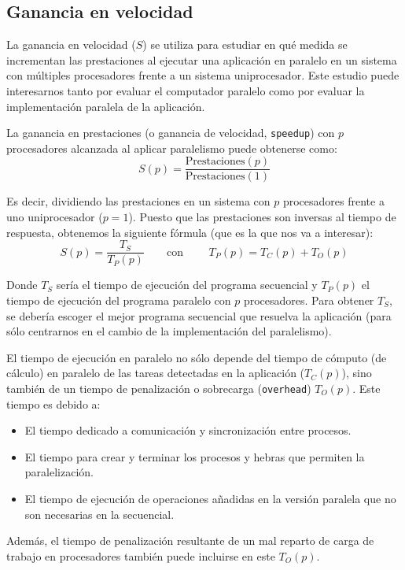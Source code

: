 
\subsection{Ganancia en velocidad}
La ganancia en velocidad ($S$) se utiliza para estudiar en qué medida se incrementan las prestaciones al ejecutar una aplicación en paralelo en un sistema con múltiples procesadores frente a un sistema uniprocesador. Este estudio puede interesarnos tanto por evaluar el computador paralelo como por evaluar la implementación paralela de la aplicación.

La ganancia en prestaciones (o ganancia de velocidad, \verb|speedup|) con $p$ procesadores alcanzada al aplicar paralelismo puede obtenerse como:
\begin{equation*}
    S(p) = \dfrac{\text{Prestaciones}(p)}{\text{Prestaciones}(1)}
\end{equation*}

Es decir, dividiendo las prestaciones en un sistema con $p$ procesadores frente a uno uniprocesador ($p=1$). Puesto que las prestaciones son inversas al tiempo de respuesta, obtenemos la siguiente fórmula (que es la que nos va a interesar):
\begin{equation}
    S(p) = \dfrac{T_S}{T_P(p)}\qquad \text{con\ }\qquad  T_P(p) = T_C(p) + T_O(p)
\end{equation}

Donde $T_S$ sería el tiempo de ejecución del programa secuencial y $T_P(p)$ el tiempo de ejecución del programa paralelo con $p$ procesadores. Para obtener $T_S$, se debería escoger el mejor programa secuencial que resuelva la aplicación (para sólo centrarnos en el cambio de la implementación del paralelismo).

El tiempo de ejecución en paralelo no sólo depende del tiempo de cómputo (de cálculo) en paralelo de las tareas detectadas en la aplicación ($T_C(p)$), sino también de un tiempo de penalización o sobrecarga (\verb|overhead|) $T_O(p)$. Este tiempo es debido a:
\begin{itemize}
    \item El tiempo dedicado a comunicación y sincronización entre procesos.
    \item El tiempo para crear y terminar los procesos y hebras que permiten la paralelización.
    \item El tiempo de ejecución de operaciones añadidas en la versión paralela que no son necesarias en la secuencial.
\end{itemize}
Además, el tiempo de penalización resultante de un mal reparto de carga de trabajo en procesadores también puede incluirse en este $T_O(p)$.

